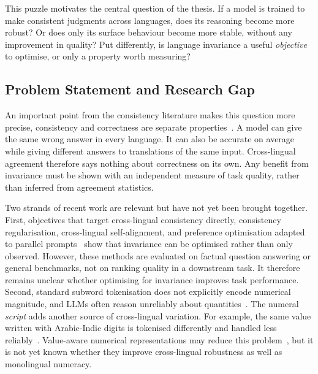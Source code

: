 This puzzle motivates the central question of the thesis. If a model is trained to make consistent
judgments across languages, does its reasoning become more robust? Or does only its surface behaviour
become more stable, without any improvement in quality? Put differently, is language invariance a
useful \emph{objective} to optimise, or only a property worth measuring?

\subsection{Problem Statement and Research Gap}
\label{sec:problem}

An important point from the consistency literature makes this question more precise, consistency and
correctness are separate properties~\cite{elazar2021measuringimprovingconsistencypretrained,Qi_2023}.
A model can give the same wrong answer in every language. It can also be accurate on average while
giving different answers to translations of the same input. Cross-lingual agreement therefore says
nothing about correctness on its own. Any benefit from invariance must be shown with an independent
measure of task quality, rather than inferred from agreement statistics.

Two strands of recent work are relevant but have not yet been brought together. First, objectives
that target cross-lingual consistency directly, consistency
regularisation, cross-lingual self-alignment, and preference optimisation adapted to parallel
prompts~\cite{zheng2021consistencyregularizationcrosslingualfinetuning,wang2025calmunleashingcrosslingualselfaligning,liu2026posttraininglanguagemodelscrosslingual} show
that invariance can be optimised rather than only observed. However, these methods are evaluated on
factual question answering or general benchmarks, not on ranking quality in a downstream task. It
therefore remains unclear whether optimising for invariance improves task performance. Second,
standard subword tokenisation does not explicitly encode numerical magnitude, and LLMs often reason
unreliably about quantities~\cite{rahman2025largelanguagemodelsnumberland,wallace2019nlpmodelsknownumbers}.
The numeral \emph{script} adds another source of cross-lingual variation. For example, the same value
written with Arabic-Indic digits is tokenised differently and handled less
reliably~\cite{reddy2026effectscriptsformatsllm}. Value-aware numerical representations may reduce
this problem~\cite{dutulescu2026valueawarenumericalrepresentationstransformer}, but it is not yet known
whether they improve cross-lingual robustness as well as monolingual numeracy.

